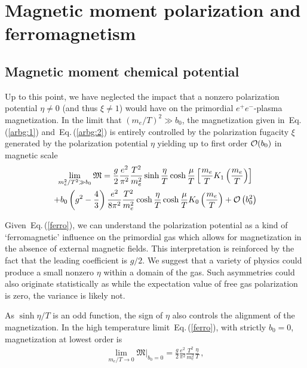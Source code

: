 \documentclass[aps,prd,floatfix,reprint]{revtex4-2}
\newcommand{\req}[1]{Eq.\,(\ref{#1})}
\begin{document}
\section{Magnetic moment polarization and ferromagnetism}
\label{sec:ferro}
\subsection{Magnetic moment chemical potential}
\label{sec:spinpot}
\noindent Up to this point, we have neglected the impact that a nonzero polarization potential $\eta\neq0$ (and thus $\xi\neq1$) would have on the primordial $e^{+}e^{-}$-plasma magnetization. In the limit that $(m_{e}/T)^2\gg b_0$, the magnetization given in~\req{arbg:1} and~\req{arbg:2} is entirely controlled by the polarization fugacity $\xi$ generated by the polarization potential $\eta$ yielding up to first order ${\cal O}(b_{0})$ in magnetic scale
\begin{multline}
 \label{ferro}
 \lim_{m_{e}^{2}/T^{2}\gg b_0}{\mathfrak M}=\frac{g}{2}\frac{e^{2}}{\pi^{2}}\frac{T^{2}}{m_{e}^{2}}\sinh{\frac{\eta}{T}}\cosh{\frac{\mu}{T}}\left[\frac{m_{e}}{T}K_{1}\left(\frac{m_{e}}{T}\right)\right]\\
 +b_{0}\left(g^{2}-\frac{4}{3}\right)\frac{e^{2}}{8\pi^{2}}\frac{T^{2}}{m_{e}^{2}}\cosh{\frac{\eta}{T}}\cosh{\frac{\mu}{T}}K_{0}\left(\frac{m_{e}}{T}\right)
 +{\cal O}\left(b_{0}^{2}\right)
\end{multline}

Given~\req{ferro}, we can understand the polarization potential as a kind of `ferromagnetic' influence on the primordial gas which allows for magnetization in the absence of external magnetic fields. This interpretation is reinforced by the fact that the leading coefficient is $g/2$. We suggest that a variety of physics could produce a small nonzero $\eta$ within a domain of the gas. Such asymmetries could also originate statistically as while the expectation value of free gas polarization is zero, the variance is likely not.

As $\sinh{\eta/T}$ is an odd function, the sign of $\eta$ also controls the alignment of the magnetization. In the high temperature limit~\req{ferro}, with strictly $b_{0}=0$, magnetization at lowest order is
\begin{align}
 \label{hiTferro}
 \lim_{m_{e}/T\rightarrow0}{\mathfrak M}\vert_{b_{0}=0}=\frac{g}{2}\frac{e^{2}}{\pi^{2}}\frac{T^{2}}{m_{e}^{2}}\frac{\eta}{T}\,,
\end{align}
\end{document}
